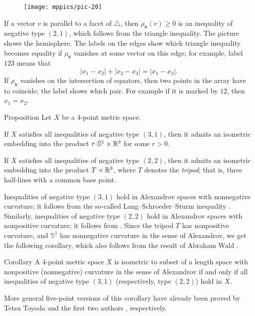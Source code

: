 \documentclass[a4paper,10pt]{article}
\begin{document}
\begin{wrapfigure}{o}{36mm}
\centering
\vskip-4mm
\texttt{[image: mppics/pic-20]}
\vskip-0mm
\end{wrapfigure}

If a vector $v$ is parallel to a facet of $\triangle$, then $\rho_{\bm{x}}(v)\ge 0$ is an inequality of negative type $(2,1)$, which follows from the triangle inequality.
The picture shows the hemisphere.
The labels on the edges show which triangle inequality becomes equality if $\rho_{\bm{x}}$ vanishes at some vector on this edge;
for example, label $123$ means that
\[|x_1-x_2|+|x_2-x_3|=|x_1-x_3|.\]
If $\rho_{\bm{x}}$ vanishes on the intersection of equators, then two points in the array have to coincide;
the label shows which pair.
For example if it is marked by $12$, then $x_1=x_2$.

\begin{thm}{Proposition}\label{prop:Four-point arrays}
Let $X$ be a 4-point metric space.

If $X$ satisfies all inequalities of negative type $(3, 1)$, then it admits an isometric embedding into the product $r\cdot \mathbb{S}^1\times\RR^3$ for some $r>0$.

If $X$ satisfies all inequalities of negative type $(2, 2)$, then it admits an isometric embedding into the product $T\times\mathbb{R}^3$, where $T$ denotes the \emph{tripod};
that is, three half-lines with a common base point.
\end{thm}

Inequalities of negative type $(3, 1)$ hold in Alexandrov spaces with nonnegative curvature; it follows from the so-called Lang--Schroeder--Sturm inequality \cite{lang-schroeder, sturm}.
Similarly, inequalities of negative type $(2, 2)$ hold in Alexandrov spaces with nonpositive curvature; it follows from \cite[9.5]{AKP-2024}.
Since the tripod $T$ has nonpositive curvature, and $\mathbb{S}^1$ has nonnegative curvature in the sense of Alexandrov, we get the following corollary, which also follows from the result of Abraham Wald \cite[§ 7]{wald}.

\begin{thm}{Corollary}\label{cor:Four-point arrays}
A 4-point metric space $X$ is isometric to subset of a length space with nonpositive (nonnegative) curvature in the sense of Alexandrov if and only if all inequalities of negative type $(3, 1)$ (respectively, type $(2, 2)$) hold in $X$.
\end{thm}

More general five-point versions of this corollary have already been proved by Tetsu Toyoda \cite{toyoda,lebedeva-petrunin2021} and the first two authors \cite{lebedeva-petrunin-2024}, respectively.
\end{document}
